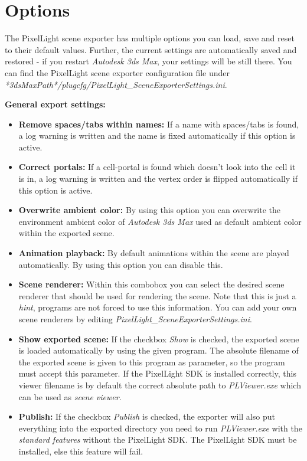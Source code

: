 \chapter{Options}
The PixelLight scene exporter has multiple options you can load, save and reset to their default values. Further, the current settings are automatically saved and restored - if you restart \emph{Autodesk 3ds Max}, your settings will be still there. You can find the PixelLight scene exporter configuration file under \emph{*3dsMaxPath*/plugcfg/PixelLight\_SceneExporterSettings.ini}.

\textbf{General export settings:}
\begin{itemize}
\item{\textbf{Remove spaces/tabs within names:} If a name with spaces/tabs is found, a log warning is written and the name is fixed automatically if this option is active.}
\item{\textbf{Correct portals:} If a cell-portal is found which doesn't look into the cell it is in, a log warning is written and the vertex order is flipped automatically if this option is active.}
\item{\textbf{Overwrite ambient color:} By using this option you can overwrite the environment ambient color of \emph{Autodesk 3ds Max} used as default ambient color within the exported scene.}
\item{\textbf{Animation playback:} By default animations within the scene are played automatically. By using this option you can disable this.}
\item{\textbf{Scene renderer:} Within this combobox you can select the desired scene renderer that should be used for rendering the scene. Note that this is just a \emph{hint}, programs are not forced to use this information. You can add your own scene renderers by editing \emph{PixelLight\_SceneExporterSettings.ini}.}
\item{\textbf{Show exported scene:} If the checkbox \emph{Show} is checked, the exported scene is loaded automatically by using the given program. The absolute filename of the exported scene is given to this program as parameter, so the program must accept this parameter. If the PixelLight \ac{SDK} is installed correctly, this viewer filename is by default the correct absolute path to \emph{PLViewer.exe} which can be used as \emph{scene viewer}.}
\item{\textbf{Publish:} If the checkbox \emph{Publish} is checked, the exporter will also put everything into the exported directory you need to run \emph{PLViewer.exe} with the \emph{standard features} without the PixelLight \ac{SDK}. The PixelLight \ac{SDK} must be installed, else this feature will fail.}
\end{itemize}

